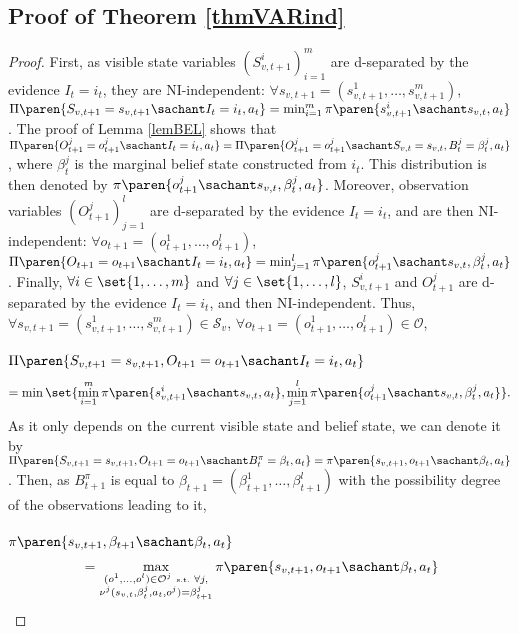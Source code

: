 \subsection{Proof of Theorem \ref{thmVARind}}
\label{thmVARind_RETURN}
\begin{proof}
First, as visible state variables $(S^i_{v,t+1})_{i=1}^m$
are d-separated by the evidence $I_t = i_t$,
they are NI-independent: $\forall s_{v,t+1} = (s^1_{v,t+1},\ldots,s^m_{v,t+1})$,
$\Pi \paren{ S_{v,t+1} = s_{v,t+1} \sachant I_t = i_t, a_t } = \min_{i=1}^m \pi \paren{ s^i_{v,t+1} \sachant s_{v,t}, a_t }$.
The proof of Lemma \ref{lemBEL} shows that $\Pi \paren{ O^j_{t+1} = o^j_{t+1} \sachant I_t = i_t, a_t } = \Pi \paren{ O^j_{t+1} = o^j_{t+1} \sachant S_{v,t}=s_{v,t}, B^j_t = \beta^j_t, a_t } $,
where $\beta^j_t$ is the marginal belief state constructed from $i_t$.
This distribution is then denoted by $\pi \paren{ o^j_{t+1} \sachant s_{v,t}, \beta^j_t, a_t }$.
Moreover, observation variables $(O^j_{t+1})_{j=1}^l$
are d-separated by the evidence $I_t = i_t$,
and are then NI-independent: $\forall o_{t+1} = (o^1_{t+1},\ldots,o^l_{t+1})$,
$\Pi \paren{ O_{t+1} = o_{t+1} \sachant I_t = i_t, a_t } = \min_{j=1}^l \pi \paren{ o^j_{t+1} \sachant s_{v,t}, \beta^j_t, a_t }$.
Finally, $\forall i \in \set{1,\ldots,m}$ and $\forall j \in \set{1,\ldots,l}$,
$S^i_{v,t+1}$ and $O^j_{t+1}$ are d-separated by the evidence $I_t = i_t$,
and then NI-independent.
Thus, $\forall s_{v,t+1}=(s^1_{v,t+1},\ldots,s^m_{v,t+1}) \in \mathcal{S}_v$,
$\forall o_{t+1} = (o^1_{t+1}, \ldots, o^l_{t+1}) \in \mathcal{O}$, \\
\\
$\Pi \paren{ S_{v,t+1} = s_{v,t+1}, O_{t+1} =  o_{t+1} \sachant  I_t = i_t, a_t}$ \\
\[= \min \set{ \min_{i=1}^{m} \pi \paren{ s^i_{v,t+1} \sachant s_{v,t}, a_t } ,  \min_{j=1}^{l} \pi \paren{ o^j_{t+1} \sachant s_{v,t}, \beta^j_t, a_t  } }.\]
As it only depends on the current visible state and belief state, we can denote it by $\Pi \paren{ S_{v,t+1} = s_{v,t+1}, O_{t+1} =  o_{t+1} \sachant  B^{\pi}_t = \beta_t, a_t} = \pi \paren{ s_{v,t+1}, o_{t+1} \sachant \beta_t, a_t}$.
Then, as $B^{\pi}_{t+1}$ is equal to $\beta_{t+1}=(\beta^1_{t+1},\ldots,\beta^l_{t+1})$ 
with the possibility degree of the observations leading to it,\\
\\
$\displaystyle \pi \paren{ s_{v,t+1}, \beta_{t+1} \sachant \beta_t, a_t}$
\begin{align*}
&= \max_{\substack{ (o^1,\ldots,o^l) \in \mathcal{O}^j \mbox{ \tiny s.t. } \forall j, \\ \nu^j(s_{v,t},\beta^j_t,a_t,o^j) = \beta^j_{t+1}}} \pi \paren{ s_{v,t+1}, o_{t+1} \sachant \beta_t, a_t}\\

\end{align*}
\end{proof}
